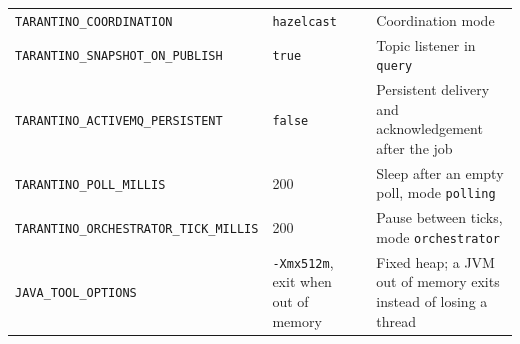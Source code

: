 \documentclass[11pt,a4paper]{article}
\newcommand{\code}[1]{\nolinkurl{#1}}
\newcommand{\mode}[1]{\code{#1}}
\begin{document}
\begin{table}[!ht]
\begin{tabularx}{\textwidth}{@{}L{5.55cm}L{2.75cm}L{1.3cm}Y@{}}
\code{TARANTINO_COORDINATION} & \code{hazelcast} & & Coordination mode \\
\code{TARANTINO_SNAPSHOT_ON_PUBLISH} & \code{true} & & Topic listener in \code{query} \\
\code{TARANTINO_ACTIVEMQ_PERSISTENT} & \code{false} & & Persistent delivery and acknowledgement after the job \\
\code{TARANTINO_POLL_MILLIS} & 200 & & Sleep after an empty poll, mode \mode{polling} \\
\code{TARANTINO_ORCHESTRATOR_TICK_MILLIS} & 200 & & Pause between ticks, mode \mode{orchestrator} \\
\code{JAVA_TOOL_OPTIONS} & \code{-Xmx512m}, exit when out of memory & & Fixed heap; a JVM out of memory exits instead of losing a thread \\
\bottomrule
\end{tabularx}
\end{table}
\end{document}
